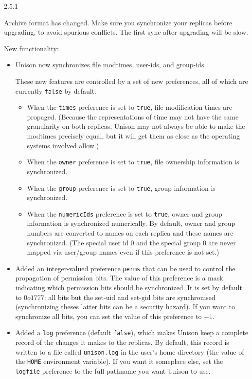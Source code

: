 \begin{changesfromversion}{2.5.1}
\item \incompatible{} Archive format has changed.  Make sure you
synchronize your replicas before upgrading, to avoid spurious
conflicts.  The first sync after upgrading will be slow.

\item New functionality:
\begin{itemize}
\item Unison now synchronizes file modtimes, user-ids, and group-ids.

These new features are controlled by a set of new preferences, all of
which are currently \verb|false| by default.

\begin{itemize}
\item When the \verb|times| preference is set to \verb|true|, file
modification times are propaged.  (Because the representations of time
may not have the same granularity on both replicas, Unison may not always
be able to make the modtimes precisely equal, but it will get them as
close as the operating systems involved allow.)
\item When the \verb|owner| preference is set to \verb|true|, file
ownership information is synchronized.
\item When the \verb|group| preference is set to \verb|true|, group
information is synchronized.
\item When the \verb|numericIds| preference is set to \verb|true|, owner
and group information is synchronized numerically.  By default, owner and
group numbers are converted to names on each replica and these names are
synchronized.  (The special user id 0 and the special group 0 are never
mapped via user/group names even if this preference is not set.)
\end{itemize}

\item Added an integer-valued preference \verb|perms| that can be used to
control the propagation of permission bits.  The value of this preference
is a mask indicating which permission bits should be synchronized.  It is
set by default to $0o1777$: all bits but the set-uid and set-gid bits are
synchronised (synchronizing theses latter bits can be a security hazard).
If you want to synchronize all bits, you can set the value of this
preference to $-1$.

\item Added a \verb|log| preference (default \verb|false|), which makes
Unison keep a complete record of the changes it makes to the replicas.
By default, this record is written to a file called \verb|unison.log| in
the user's home directory (the value of the \verb|HOME| environment
variable).  If you want it someplace else, set the \verb|logfile|
preference to the full pathname you want Unison to use.


\end{itemize}
\end{changesfromversion}
